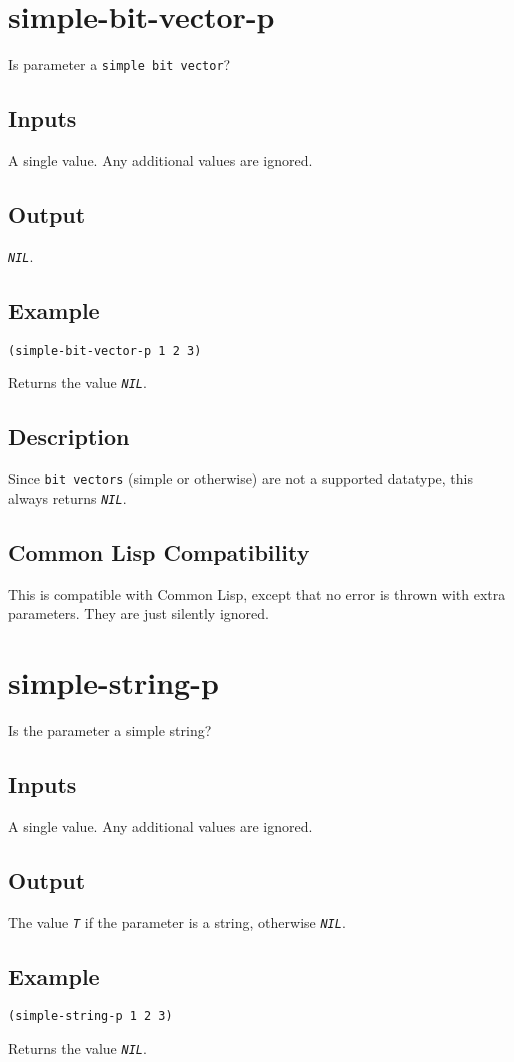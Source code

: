 \documentclass[10pt, openany]{book}
\newcommand{\constant}[1]{\emph{\texttt{#1}}}
\newcommand{\datatype}[1]{\texttt{#1}}
\newcommand{\cl}{Common Lisp}
\begin{document}
\section{simple-bit-vector-p}
Is parameter a \datatype{simple bit vector}?
\subsection{Inputs}
A single value.  Any additional values are ignored.
\subsection{Output}
\constant{NIL}.
\subsection{Example}
\begin{lstlisting}
(simple-bit-vector-p 1 2 3)
\end{lstlisting}
Returns the value \constant{NIL}.
\subsection{Description}
Since \datatype{bit vectors} (simple or otherwise) are not a supported datatype, this always returns \constant{NIL}.
\subsection{Common Lisp Compatibility}
This is compatible with \cl, except that no error is thrown with extra parameters.  They are just silently ignored.

\section{simple-string-p}
Is the parameter a simple string?
\subsection{Inputs}
A single value.  Any additional values are ignored.
\subsection{Output}
The value \constant{T} if the parameter is a string, otherwise \constant{NIL}.
\subsection{Example}
\begin{lstlisting}
(simple-string-p 1 2 3)
\end{lstlisting}
Returns the value \constant{NIL}.
\end{document}

